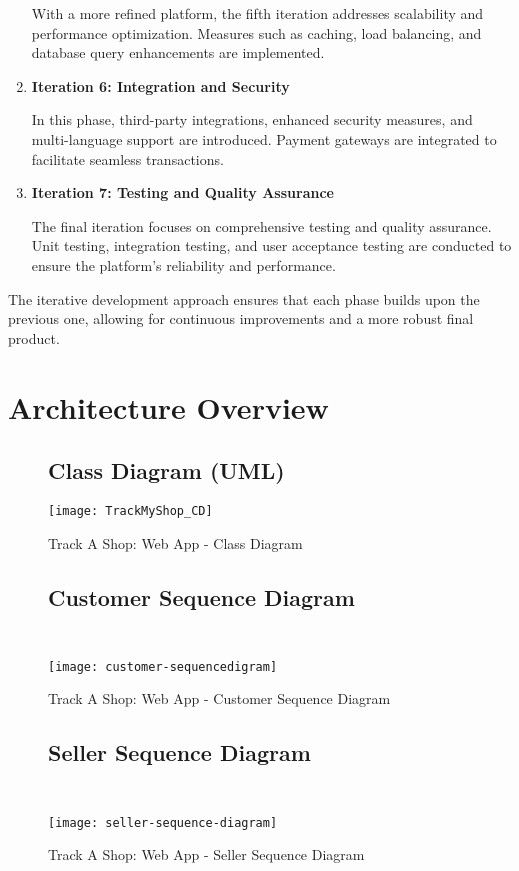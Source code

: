 \begin{enumerate}
	With a more refined platform, the fifth iteration addresses scalability and performance optimization. Measures such as caching, load balancing, and database query enhancements are implemented.
	
	\item \textbf{Iteration 6: Integration and Security}
	
	In this phase, third-party integrations, enhanced security measures, and multi-language support are introduced. Payment gateways are integrated to facilitate seamless transactions.
	
	\item \textbf{Iteration 7: Testing and Quality Assurance}
	
	The final iteration focuses on comprehensive testing and quality assurance. Unit testing, integration testing, and user acceptance testing are conducted to ensure the platform's reliability and performance.
\end{enumerate}

The iterative development approach ensures that each phase builds upon the previous one, allowing for continuous improvements and a more robust final product.


\newpage

\section{Architecture Overview}


\begin{figure}[h]
	\subsection{Class Diagram (UML) }
	\centering
	\texttt{[image: TrackMyShop\_CD]}
	\caption{Track A Shop: Web App - Class Diagram}
\end{figure}

\pagebreak
\begin{figure}[h]
	\subsection{Customer Sequence Diagram \\\\}
	\centering
	\texttt{[image: customer-sequencedigram]}
	\caption{Track A Shop: Web App - Customer Sequence Diagram}
\end{figure}

\pagebreak
\begin{figure}[h]
	\subsection{Seller Sequence Diagram \\\\}
	\centering
	\texttt{[image: seller-sequence-diagram]}
	\caption{Track A Shop: Web App - Seller Sequence Diagram}
\end{figure}


